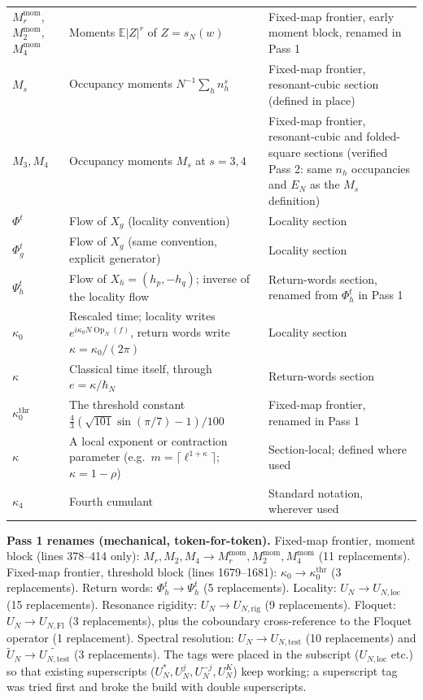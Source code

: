 \begin{center}
\begin{tabular}{>{\raggedright\arraybackslash}p{}>{\raggedright\arraybackslash}p{}>{\raggedright\arraybackslash}p{}}
\(M_r^{\mathrm{mom}}\), \(M_2^{\mathrm{mom}}\), \(M_4^{\mathrm{mom}}\) &
  Moments \(\mathbb{E}|Z|^r\) of \(Z=s_N(w)\) & Fixed-map frontier,
  early moment block, renamed in Pass 1 \\
\(M_s\) & Occupancy moments \(N^{-1}\sum_h n_h^s\) &
  Fixed-map frontier, resonant-cubic section (defined in place) \\
\(M_3, M_4\) & Occupancy moments \(M_s\) at \(s=3,4\) &
  Fixed-map frontier, resonant-cubic and folded-square sections
  (verified Pass 2: same \(n_h\) occupancies and \(E_N\) as the
  \(M_s\) definition) \\
\(\Phi^t\) & Flow of \(X_g\) (locality convention) &
  Locality section \\
\(\Phi_g^t\) & Flow of \(X_g\) (same convention, explicit generator) &
  Locality section \\
\(\Psi_h^t\) & Flow of \(X_h=(h_p,-h_q)\); inverse of the locality flow &
  Return-words section, renamed from \(\Phi_h^t\) in Pass 1 \\
\(\kappa_0\) & Rescaled time; locality writes
  \(e^{i\kappa_0N\operatorname{Op}_N(f)}\), return words write
  \(\kappa=\kappa_0/(2\pi)\) & Locality section \\
\(\kappa\) & Classical time itself, through \(e=\kappa/\hbar_N\) &
  Return-words section \\
\(\kappa_0^{\mathrm{thr}}\) & The threshold constant
  \(\frac43(\sqrt{101}\sin(\pi/7)-1)/100\) & Fixed-map frontier,
  renamed in Pass 1 \\
\(\kappa\) & A local exponent or contraction parameter (e.g.\
  \(m=\lceil\ell^{1+\kappa}\rceil\); \(\kappa=1-\rho\)) &
  Section-local; defined where used \\
\(\kappa_4\) & Fourth cumulant & Standard notation, wherever used \\
\end{tabular}
\end{center}

\noindent\textbf{Pass 1 renames (mechanical, token-for-token).}
Fixed-map frontier, moment block (lines 378--414 only):
\(M_r, M_2, M_4 \to M_r^{\mathrm{mom}}, M_2^{\mathrm{mom}},
M_4^{\mathrm{mom}}\) (11 replacements).
Fixed-map frontier, threshold block (lines 1679--1681):
\(\kappa_0 \to \kappa_0^{\mathrm{thr}}\) (3 replacements).
Return words: \(\Phi_h^t \to \Psi_h^t\) (5 replacements).
Locality: \(U_N \to U_{N,\mathrm{loc}}\) (15 replacements).
Resonance rigidity: \(U_N \to U_{N,\mathrm{rig}}\) (9 replacements).
Floquet: \(U_N \to U_{N,\mathrm{Fl}}\) (3 replacements), plus the
coboundary cross-reference to the Floquet operator (1 replacement).
Spectral resolution: \(U_N \to U_{N,\mathrm{test}}\) (10 replacements)
and \(\widetilde U_N \to \widetilde{U_{N,\mathrm{test}}}\) (3 replacements).
The tags were placed in the subscript (\(U_{N,\mathrm{loc}}\) etc.) so
that existing superscripts (\(U_N^*, U_N^j, U_N^{-j}, U_N^K\)) keep
working; a superscript tag was tried first and broke the build with
double superscripts.


